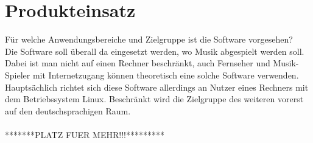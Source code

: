 \chapter{Produkteinsatz}
Für welche Anwendungsbereiche und Zielgruppe ist die Software vorgesehen?\ \\

Die Software soll überall da eingesetzt werden, wo Musik abgespielt werden soll. Dabei ist man nicht auf einen Rechner beschränkt, auch Fernseher und Musik-Spieler mit Internetzugang können theoretisch eine solche Software verwenden.\ \\

Hauptsächlich richtet sich diese Software allerdings an Nutzer eines Rechners mit dem Betriebssystem Linux. Beschränkt wird die Zielgruppe des weiteren vorerst auf den deutschsprachigen Raum.\ \\ \\

*******PLATZ FUER MEHR!!!*********

